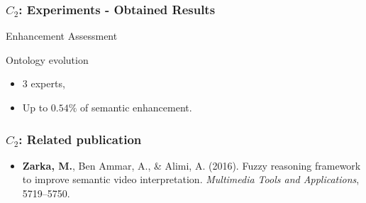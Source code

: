 \begin{frame}
	\frametitle{$C_{2}$: Experiments - Obtained Results}
	\begin{exampleblock}{Enhancement Assessment}
		{\small {}}
	\end{exampleblock}	
	
	\begin{exampleblock}{Ontology evolution}
	{\footnotesize
		\begin{itemize}
			\item \alert{$3$} experts,
			\item Up to \alert{$0.54 \%$} of semantic enhancement.
		\end{itemize}
	}
	\end{exampleblock}
\end{frame}

\begin{frame}
	\frametitle{$C_{2}$: Related publication}
	\begin{block}{}
		\begin{itemize}
			\item \citep{Zarka2015} \textbf{Zarka, M.}, Ben Ammar, A., \&{} Alimi, A. (2016). 
				Fuzzy reasoning framework to improve semantic video interpretation. 
				\emph{Multimedia Tools and Applications}, 5719--5750.
		\end{itemize}
	\end{block}
\end{frame}

